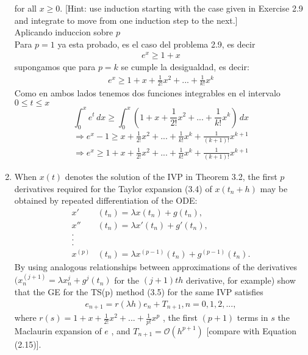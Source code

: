 \begin{enumerate}
		for all $x \geq 0$. [Hint: use induction starting with the case given in
		Exercise 2.9 and integrate to move from one induction step to the
		next.]\\
		Aplicando induccion sobre $p$ \\
		Para $p = 1$ ya esta probado, es el caso del problema 2.9, es decir \\
		\begin{align*}
			e^x \geq 1 + x 
		\end{align*}
		supongamos que para $p = k$ se cumple la desigualdad, es decir:
		\begin{align*}
			e^x \geq 1 + x + \frac{1}{2!} x^2 + ... + \frac{1}{k!} x^k
		\end{align*}
		Como en ambos lados tenemos dos funciones integrables en el intervalo $0 \leq t \leq x$
		\[
		\int_{0}^{x} e^{t} \, dx \geq \int_{0}^{x} (1 + x + \frac{1}{2!} x^2 + ... + \frac{1}{k!} x^k) \, dx  
		\]
		\begin{align*}
			\Longrightarrow e^x - 1 \geq x + \frac{1}{2!} x^2 + ... + \frac{1}{k!} x^k + \frac{1}{(k+1)!} x^{k+1} \\
			\Longrightarrow e^x \geq 1 + x + \frac{1}{2!} x^2 + ... + \frac{1}{k!} x^k + \frac{1}{(k+1)!} x^{k+1}
		\end{align*}		
	\item
		When $x(t)$ denotes the solution of the IVP in Theorem 3.2, the
		first $p$ derivatives required for the Taylor expansion (3.4) of $x(t_n + h)$
		may be obtained by repeated differentiation of the ODE:
		\begin{align*}
			x'&(t_n) = \lambda x(t_n) + g(t_n),\\
			x''&(t_n) = \lambda x'(t_n) + g'(t_n),\\
			.\\
			.\\
			.\\	
			x^{(p)}&(t_n) = \lambda x^{(p-1)}(t_n) + g^{(p-1)}(t_n).	
		\end{align*}
		By using analogous relationships between approximations of the derivatives
		 $(x_n^{(j+1)} = \lambda x_n^j + g^j (t_n)$ for the $(j + 1)th$ derivative,
		for example) show that the GE for the TS(p) method (3.5) for the
		same IVP satisfies
		\begin{align*}
			e_{n+1} = r(\lambda h)e_n + T_{n+1},   n = 0, 1, 2, . . . ,
		\end{align*}
		where $r(s) = 1 + x + \frac{1}{2!} x^2 + ... + \frac{1}{p!} x^p$ , the first $(p + 1)$ terms in $s$ the Maclaurin expansion of $e$ , and $T_{n+1} = \mathcal{O}(h^{p+1})$ [compare with Equation (2.15)].\\

\end{enumerate}
